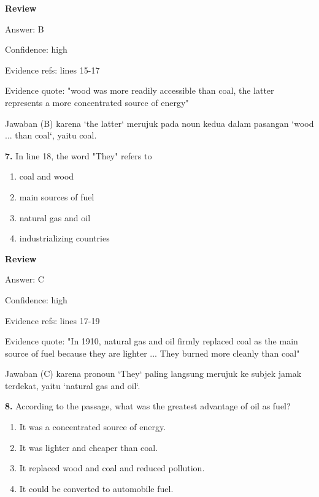 \documentclass[12pt]{article}
\begin{document}
\begingroup
\setlength{\parskip}{0pt}
\setlength{\parindent}{0pt}
\textbf{Review}\par
Answer: B\par
Confidence: high\par
Evidence refs: lines 15-17\par
Evidence quote: "wood was more readily accessible than coal, the latter represents a more concentrated source of energy"\par
Jawaban (B) karena `the latter` merujuk pada noun kedua dalam pasangan `wood ... than coal`, yaitu coal.\par
\endgroup
\par
\vspace{0.25\baselineskip}
\noindent\textbf{7.} In line 18, the word "They" refers to
\begin{enumerate}[label=(\Alph*),leftmargin=*,itemsep=0.2em]
\item coal and wood
\item main sources of fuel
\item natural gas and oil
\item industrializing countries
\end{enumerate}
\par
\begingroup
\setlength{\parskip}{0pt}
\setlength{\parindent}{0pt}
\textbf{Review}\par
Answer: C\par
Confidence: high\par
Evidence refs: lines 17-19\par
Evidence quote: "In 1910, natural gas and oil firmly replaced coal as the main source of fuel because they are lighter ... They burned more cleanly than coal"\par
Jawaban (C) karena pronoun `They` paling langsung merujuk ke subjek jamak terdekat, yaitu `natural gas and oil`.\par
\endgroup
\par
\vspace{0.25\baselineskip}
\noindent\textbf{8.} According to the passage, what was the greatest advantage of oil as fuel?
\begin{enumerate}[label=(\Alph*),leftmargin=*,itemsep=0.2em]
\item It was a concentrated source of energy.
\item It was lighter and cheaper than coal.
\item It replaced wood and coal and reduced pollution.
\item It could be converted to automobile fuel.
\end{enumerate}
\end{document}
